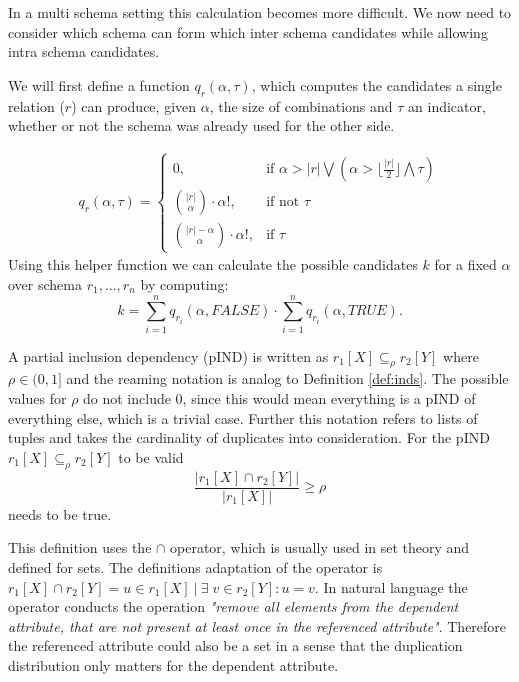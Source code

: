In a multi schema setting this calculation becomes more difficult. We now need to consider which schema can form which inter schema candidates while allowing intra schema candidates.
\begin{definition}\label{def:candidates-MS}
    We will first define a function $q_r(\alpha, \tau)$, which computes the candidates a single relation ($r$) can produce, given $\alpha$, the size of combinations and $\tau$ an indicator, whether or not the schema was already used for the other side.

    \begin{align*}
        q_r(\alpha, \tau) = \begin{cases}
            0, & \text{if } \alpha > |r| \bigvee (\alpha > \lfloor\frac{|r|}{2}\rfloor \bigwedge \tau)\\
            \binom{|r|}{\alpha}\cdot \alpha!, & \text{if not } \tau \\
            \binom{|r| - \alpha}{\alpha}\cdot \alpha!, & \text{if } \tau
        \end{cases}
    \end{align*}
    Using this helper function we can calculate the possible candidates $k$ for a fixed $\alpha$ over schema $r_1, \dots, r_n$ by computing:
    $$
        k = \sum\limits_{i = 1}^n q_{r_i}(\alpha, FALSE) \cdot \sum\limits_{i = 1}^n q_{r_i}(\alpha, TRUE).
    $$
\end{definition}

\begin{definition}\label{def:pinds}
    A partial inclusion dependency (pIND) is written as $r_1[X] \subseteq_{\rho} r_2[Y]$ where $\rho \in (0, 1]$ and the reaming notation is analog to Definition \ref{def:inds}. The possible values for $\rho$ do not include $0$, since this would mean everything is a pIND of everything else, which is a trivial case. Further this notation refers to lists of tuples and takes the cardinality of duplicates into consideration. For the pIND $r_1[X] \subseteq_{\rho} r_2[Y]$ to be valid
    $$
        \frac{|r_1[X] \cap r_2[Y]|}
            {|r_1[X]|} \geq \rho
    $$
    needs to be true.
\end{definition}

This definition uses the $\cap$ operator, which is usually used in set theory and defined for sets. 
The definitions adaptation of the operator is $r_1[X] \cap r_2[Y] = u \in r_1[X] \: | \: \exists \; v \in r_2[Y] : u = v$.
In natural language the operator conducts the operation \textit{"remove all elements from the dependent attribute, that are not present at least once in the referenced attribute"}. Therefore the referenced attribute could also be a set in a sense that the duplication distribution only matters for the dependent attribute.\\

